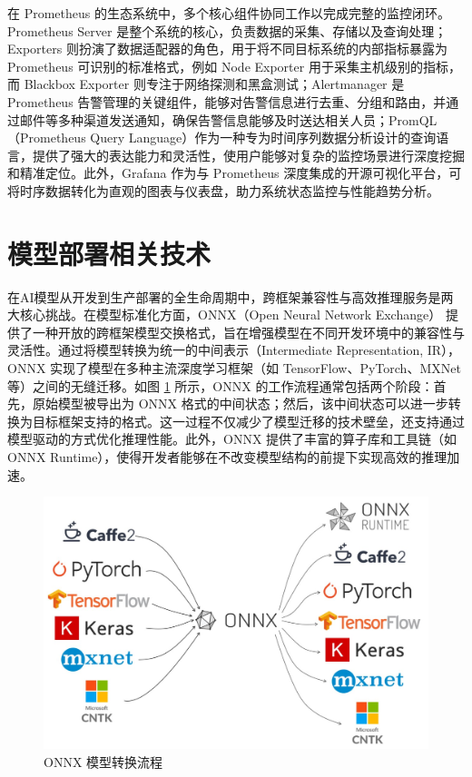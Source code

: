 在 Prometheus 的生态系统中，多个核心组件协同工作以完成完整的监控闭环。Prometheus Server 是整个系统的核心，负责数据的采集、存储以及查询处理；Exporters 则扮演了数据适配器的角色，用于将不同目标系统的内部指标暴露为 Prometheus 可识别的标准格式，例如 Node Exporter 用于采集主机级别的指标，而 Blackbox Exporter 则专注于网络探测和黑盒测试；Alertmanager 是 Prometheus 告警管理的关键组件，能够对告警信息进行去重、分组和路由，并通过邮件等多种渠道发送通知，确保告警信息能够及时送达相关人员；PromQL（Prometheus Query Language）作为一种专为时间序列数据分析设计的查询语言，提供了强大的表达能力和灵活性，使用户能够对复杂的监控场景进行深度挖掘和精准定位。此外，Grafana 作为与 Prometheus 深度集成的开源可视化平台，可将时序数据转化为直观的图表与仪表盘，助力系统状态监控与性能趋势分析。

\section{模型部署相关技术}

在AI模型从开发到生产部署的全生命周期中，跨框架兼容性与高效推理服务是两大核心挑战。在模型标准化方面，ONNX（Open Neural Network Exchange）\cite{bai2017onnx} 提供了一种开放的跨框架模型交换格式，旨在增强模型在不同开发环境中的兼容性与灵活性。通过将模型转换为统一的中间表示（Intermediate Representation, IR），ONNX 实现了模型在多种主流深度学习框架（如 TensorFlow、PyTorch、MXNet 等）之间的无缝迁移。如图 \ref{fig:2-6onnx} 所示，ONNX 的工作流程通常包括两个阶段：首先，原始模型被导出为 ONNX 格式的中间状态；然后，该中间状态可以进一步转换为目标框架支持的格式。这一过程不仅减少了模型迁移的技术壁垒，还支持通过模型驱动的方式优化推理性能。此外，ONNX 提供了丰富的算子库和工具链（如 ONNX Runtime），使得开发者能够在不改变模型结构的前提下实现高效的推理加速。

\begin{figure}[ht]
  \centering
  \includegraphics[width=0.7\linewidth]{pics/2-6onnx.png}
  \caption{ONNX 模型转换流程\cite{bai2017onnx}}
  \label{fig:2-6onnx}
\end{figure}

